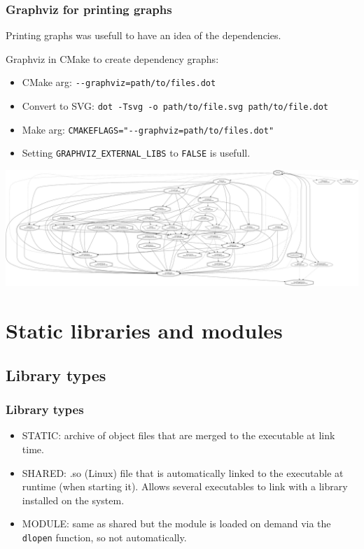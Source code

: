 \documentclass{beamer}
\begin{document}
    \begin{frame}[fragile]
        \frametitle{Graphviz for printing graphs}

        Printing graphs was usefull to have an idea of the dependencies.

        Graphviz in CMake to create dependency graphs:
        \begin{itemize}
            \item CMake arg: \verb'--graphviz=path/to/files.dot'
            \item Convert to SVG: \verb'dot -Tsvg -o path/to/file.svg path/to/file.dot'
            \item Make arg: \verb'CMAKEFLAGS="--graphviz=path/to/files.dot"'
            \item Setting \verb'GRAPHVIZ_EXTERNAL_LIBS' to \verb'FALSE' is usefull.
        \end{itemize}

    \end{frame}

    \begin{frame}
        \includegraphics[width=\textwidth]{graphviz.png}
    \end{frame}

\section{Static libraries and modules}

    \begin{frame}
        \tableofcontents[currentsection]
    \end{frame}

    \subsection{Library types}

    \begin{frame}[fragile]
        \frametitle{Library types}

        \begin{itemize}
            \item STATIC: archive of object files that are merged to the executable at link time.
            \item SHARED: .so (Linux) file that is automatically linked to the executable at runtime (when starting it).
            Allows several executables to link with a library installed on the system.
            \item MODULE: same as shared but the module is loaded on demand via the \verb'dlopen' function, so not automatically.
        \end{itemize}
    \end{frame}
\end{document}
